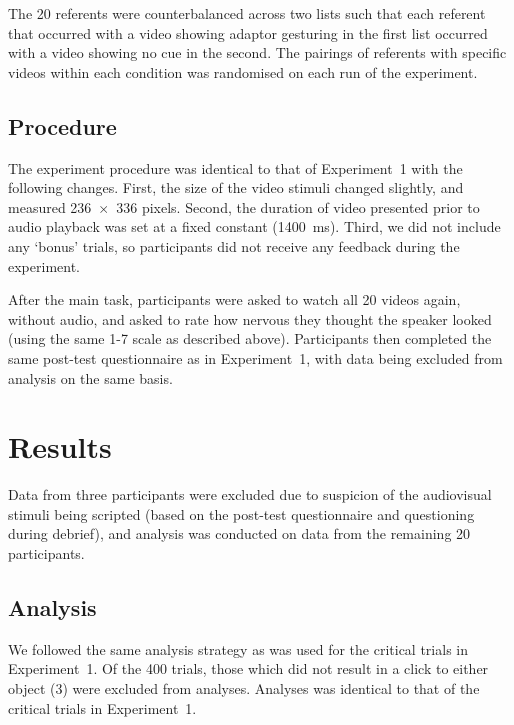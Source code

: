 \documentclass[a4paper,man,natbib]{apa6}
\begin{document}
The 20 referents were counterbalanced across two lists such that each referent that occurred with a video showing adaptor gesturing in the first list occurred with a video showing no cue in the second.
The pairings of referents with specific videos within each condition was randomised on each run of the experiment.

\subsection{Procedure}
The experiment procedure was identical to that of Experiment~1 with the following changes.
First, the size of the video stimuli changed slightly, and measured 236~$\times$~336 pixels.
Second, the duration of video presented prior to audio playback was set at a fixed constant (1400~ms).
Third, we did not include any `bonus' trials, so participants did not receive any feedback during the experiment.

After the main task, participants were asked to watch all 20 videos again, without audio, and asked to rate how nervous they thought the speaker looked (using the same 1-7 scale as described above).
Participants then completed the same post-test questionnaire as in Experiment~1, with data being excluded from analysis on the same basis.

\section{Results}
Data from three participants were excluded due to suspicion of the audiovisual stimuli being scripted (based on the post-test questionnaire and questioning during debrief), and analysis was conducted on data from the remaining 20 participants.

\subsection{Analysis}
We followed the same analysis strategy as was used for the critical trials in Experiment~1.
Of the 400 trials, those which did not result in a click to either object (3) were excluded from analyses.
Analyses was identical to that of the critical trials in Experiment~1.
\end{document}
